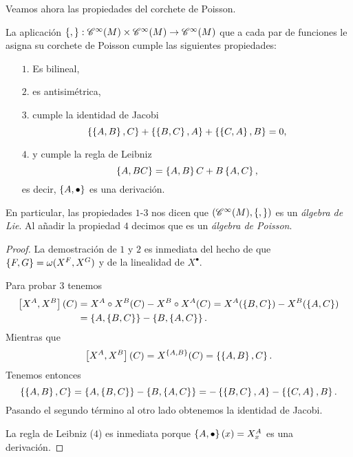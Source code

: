   Veamos ahora las propiedades del corchete de Poisson.
  \begin{prop}
    La aplicación $\left\lbrace , \right\rbrace:\mathscr{C}^{\infty}(M)\times\mathscr{C}^{\infty}(M) \rightarrow \mathscr{C}^{\infty}(M)$ que a cada par de funciones le asigna su corchete de Poisson cumple las siguientes propiedades:
\begin{enumerate}
  \item[$1.$] Es bilineal,
  \item[$2.$] es antisimétrica,
  \item[$3.$]  cumple la identidad de Jacobi
 \begin{equation*}
   \left\lbrace\left\lbrace A,B\right\rbrace,C\right\rbrace+ \left\lbrace\left\lbrace B,C\right\rbrace,A\right\rbrace + \left\lbrace\left\lbrace C,A\right\rbrace,B\right\rbrace=0,
 \end{equation*}
 \item[$4.$] y cumple la regla de Leibniz
   \begin{equation*}
     \left\lbrace A,BC\right\rbrace=\left\lbrace A,B\right\rbrace C+B\left\lbrace A,C\right\rbrace,
   \end{equation*}
   es decir, $\left\lbrace A,\bullet\right\rbrace$ es una derivación.
\end{enumerate}
  \end{prop}
En particular, las propiedades $1$-$3$ nos dicen que $(\mathscr{C}^{\infty}(M),\left\lbrace , \right\rbrace)$ es un \emph{álgebra de Lie}. Al añadir la propiedad $4$ decimos que es un \emph{álgebra de Poisson}. 

  \begin{proof}
    La demostración de $1$ y $2$ es inmediata del hecho de que $\left\lbrace F,G\right\rbrace=\omega(X^F,X^G)$ y de la linealidad de $X^{\bullet}$.

    Para probar $3$ tenemos 
   \begin{align*}
     \left[X^A,X^B\right] (C) & = X^A\circ X^B (C) - X^B\circ X^A (C)  = X^A(\left\lbrace B,C\right\rbrace)-X^B(\left\lbrace A,C\right\rbrace) \\
     &= \left\lbrace A,\left\lbrace B,C\right\rbrace\right\rbrace-\left\lbrace B,\left\lbrace A,C\right\rbrace\right\rbrace.
   \end{align*}
   Mientras que
   \begin{equation*}
     \left[X^A,X^B\right](C)=X^{\left\lbrace A,B\right\rbrace}(C)=\left\lbrace\left\lbrace A,B\right\rbrace,C\right\rbrace.
   \end{equation*}
   Tenemos entonces
   \begin{equation*}
     \left\lbrace\left\lbrace A,B\right\rbrace,C\right\rbrace=\left\lbrace A,\left\lbrace B,C\right\rbrace\right\rbrace-\left\lbrace B,\left\lbrace A,C\right\rbrace\right\rbrace=-\left\lbrace\left\lbrace B,C\right\rbrace,A\right\rbrace-\left\lbrace\left\lbrace C,A\right\rbrace,B\right\rbrace.
   \end{equation*}
   Pasando el segundo término al otro lado obtenemos la identidad de Jacobi.
    
   La regla de Leibniz ($4$) es inmediata porque $\left\lbrace A,\bullet\right\rbrace(x)=X^A_x$ es una derivación.
  \end{proof}


